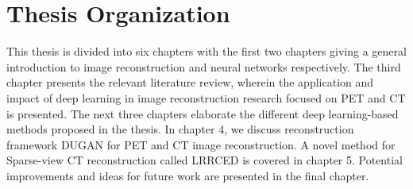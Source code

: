 \section{Thesis Organization}

This thesis is divided into six chapters with the first two chapters giving a general introduction to image reconstruction and neural networks respectively. The third chapter presents the relevant literature review, wherein the application and impact of deep learning in image reconstruction research focused on \ac{PET} and \ac{CT} is presented. The next three chapters elaborate the different deep learning-based methods proposed in the thesis.   
In chapter 4, we discuss reconstruction framework \ac{DUGAN} for \ac{PET} and \ac{CT} image reconstruction. A novel method for Sparse-view \ac{CT} reconstruction called \ac{LRRCED} is covered in chapter 5. Potential improvements and ideas for future work are presented in the final chapter. 

